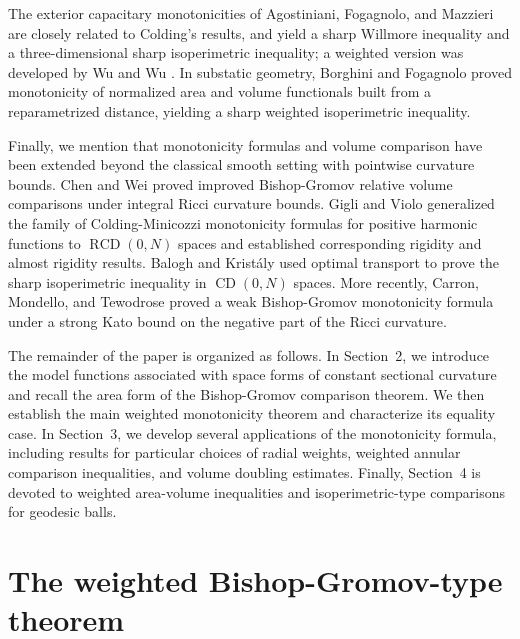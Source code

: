 \documentclass[11pt]{article}
\begin{document}
The exterior capacitary monotonicities of Agostiniani, Fogagnolo, and Mazzieri \cite{AgostinianiFogagnoloMazzieri} are closely related to Colding's results, and yield a sharp Willmore inequality and a three-dimensional sharp isoperimetric inequality; a weighted version was developed by Wu and Wu \cite{WuWu}. In substatic geometry, Borghini and Fogagnolo \cite{BorghiniFogagnolo} proved monotonicity of normalized area and volume functionals built from a reparametrized distance, yielding a sharp weighted isoperimetric inequality.

Finally, we mention that monotonicity formulas and volume comparison have been extended beyond the classical smooth setting with pointwise curvature bounds. Chen and Wei \cite{ChenWei} proved improved Bishop-Gromov relative volume comparisons under integral Ricci curvature bounds. Gigli and Violo \cite{GigliViolo} generalized the family of Colding-Minicozzi monotonicity formulas for positive harmonic functions to $\operatorname{RCD}(0,N)$ spaces and established corresponding rigidity and almost rigidity results. Balogh and Krist\'aly \cite{BaloghKristaly} used optimal transport to prove the sharp isoperimetric inequality in $\operatorname{CD}(0,N)$ spaces. More recently, Carron, Mondello, and Tewodrose \cite{CarronMondelloTewodrose} proved a weak Bishop-Gromov monotonicity formula under a strong Kato bound on the negative part of the Ricci curvature. 

The remainder of the paper is organized as follows. In Section~2, we introduce the model functions associated with space forms of constant sectional curvature and recall the area form of the Bishop-Gromov comparison theorem. We then establish the main weighted monotonicity theorem and characterize its equality case. In Section~3, we develop several applications of the monotonicity formula, including results for particular choices of radial weights, weighted annular comparison inequalities, and volume doubling estimates. Finally, Section~4 is devoted to weighted area-volume inequalities and isoperimetric-type comparisons for geodesic balls.


\section{The weighted Bishop-Gromov-type theorem}
\end{document}
